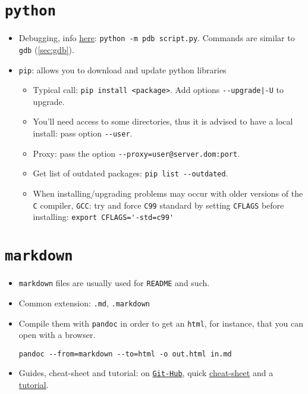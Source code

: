 \documentclass[a4paper,12pt,%
              final%
              ]{article}
\begin{document}
\section{\texttt{python}}
\label{sec:python}
\begin{itemize}
  \item Debugging, info \href{https://docs.python.org/2/library/pdb.html}{here}: \texttt{python -m pdb script.py}.
    Commands are similar to \texttt{gdb} (\ref{sec:gdb}).
  \item \texttt{pip}: allows you to download and update python libraries
    \begin{itemize}
      \item Typical call: \verb|pip install <package>|. Add options \verb!--upgrade|-U! to upgrade.
      \item You'll need access to some directories, thus it is advised to have a local install: pass option \verb|--user|.
      \item Proxy: pass the option \verb|--proxy=user@server.dom:port|. 
      \item Get list of outdated packages: \verb|pip list --outdated|.
      \item When installing/upgrading problems may occur with older versions of the \texttt{C} compiler, \texttt{GCC}: try and force \texttt{C99} standard by setting \texttt{CFLAGS} before installing: \verb|export CFLAGS='-std=c99'|
    \end{itemize}
\end{itemize}

\section{\texttt{markdown}}
\begin{itemize}
  \item \texttt{markdown} files are usually used for \texttt{README} and such.
  \item Common extension: \texttt{.md}, \texttt{.markdown}
  \item Compile them with \texttt{pandoc} in order to get an \texttt{html}, for instance, that you can open with a browser.
\begin{verbatim}
pandoc --from=markdown --to=html -o out.html in.md
\end{verbatim}
  \item Guides, cheat-sheet and tutorial: on \href{https://github.com/adam-p/markdown-here/wiki/Markdown-Cheatsheet}{\texttt{Git-Hub}}, quick \href{https://commonmark.org/help/}{cheat-sheet} and a \href{https://agea.github.io/tutorial.md/}{tutorial}.
\end{itemize}
\end{document}

